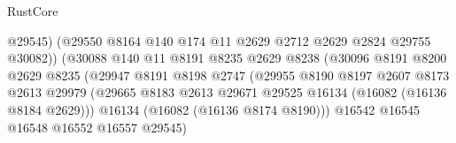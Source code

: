 \begin{lexlean}{RustCore}
\begin{coremodule}
                                            @29545)
                                          (@29550
                                            @8164
                                            @140
                                            @174
                                            @11
                                            @2629
                                            @2712
                                            @2629
                                            @2824
                                            @29755
                                            @30082))
                                        (@30088
                                          @140
                                          @11
                                          @8191
                                          @8235
                                          @2629
                                          @8238
                                          (@30096
                                            @8191
                                            @8200
                                            @2629
                                            @8235
                                            (@29947
                                              @8191
                                              @8198
                                              @2747
                                              (@29955
                                                @8190
                                                @8197
                                                @2607
                                                @8173
                                                @2613
                                                @29979
                                                (@29665
                                                  @8183
                                                  @2613
                                                  @29671
                                                  @29525
                                                  @16134
                                                  (@16082 (@16136 @8184 @2629)))
                                                @16134
                                                (@16082 (@16136 @8174 @8190)))
                                              @16542
                                              @16545
                                              @16548
                                              @16552
                                              @16557
                                              @29545)

\end{coremodule}
\end{lexlean}
